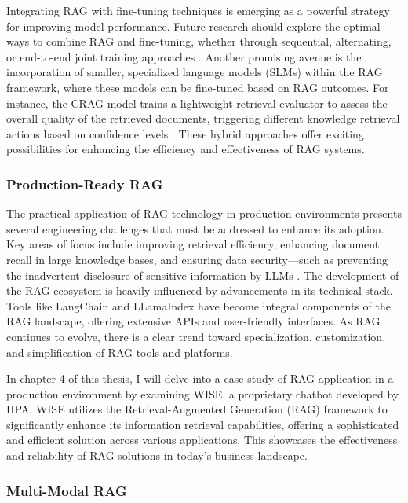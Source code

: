 Integrating RAG with fine-tuning techniques is emerging as a powerful strategy for improving model performance. Future research should explore the optimal ways to combine RAG and fine-tuning, whether through sequential, alternating, or end-to-end joint training approaches \cite{lin2023ra}. Another promising avenue is the incorporation of smaller, specialized language models (SLMs) within the RAG framework, where these models can be fine-tuned based on RAG outcomes. For instance, the CRAG model trains a lightweight retrieval evaluator to assess the overall quality of the retrieved documents, triggering different knowledge retrieval actions based on confidence levels \cite{yan2024corrective}. These hybrid approaches offer exciting possibilities for enhancing the efficiency and effectiveness of RAG systems.

\subsubsection{Production-Ready RAG}

The practical application of RAG technology in production environments presents several engineering challenges that must be addressed to enhance its adoption. Key areas of focus include improving retrieval efficiency, enhancing document recall in large knowledge bases, and ensuring data security—such as preventing the inadvertent disclosure of sensitive information by LLMs \cite{alon2022neuro}. The development of the RAG ecosystem is heavily influenced by advancements in its technical stack. Tools like LangChain and LLamaIndex have become integral components of the RAG landscape, offering extensive APIs and user-friendly interfaces. As RAG continues to evolve, there is a clear trend toward specialization, customization, and simplification of RAG tools and platforms.

In chapter 4 of this thesis, I will delve into a case study of RAG application in a production environment by examining WISE, a proprietary chatbot developed by HPA. WISE utilizes the Retrieval-Augmented Generation (RAG) framework to significantly enhance its information retrieval capabilities, offering a sophisticated and efficient solution across various applications. This showcases the effectiveness and reliability of RAG solutions in today’s business landscape.

\subsubsection{Multi-Modal RAG}

